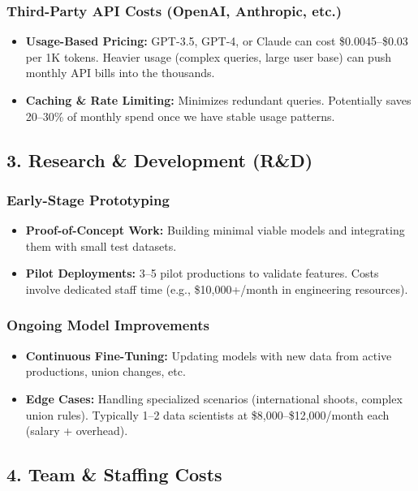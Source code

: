 \documentclass[11pt]{article}
\begin{document}
\subsubsection{Third-Party API Costs (OpenAI, Anthropic, etc.)}
\begin{itemize}
    \item \textbf{Usage-Based Pricing:} GPT-3.5, GPT-4, or Claude can cost \$0.0045--\$0.03 per 1K tokens. Heavier usage (complex queries, large user base) can push monthly API bills into the thousands.
    \item \textbf{Caching \& Rate Limiting:} Minimizes redundant queries. Potentially saves 20--30\% of monthly spend once we have stable usage patterns.
\end{itemize}

\subsection{3. Research \& Development (R\&D)}

\subsubsection{Early-Stage Prototyping}
\begin{itemize}
    \item \textbf{Proof-of-Concept Work:} Building minimal viable models and integrating them with small test datasets.
    \item \textbf{Pilot Deployments:} 3--5 pilot productions to validate features. Costs involve dedicated staff time (e.g., \$10,000+/month in engineering resources).
\end{itemize}

\subsubsection{Ongoing Model Improvements}
\begin{itemize}
    \item \textbf{Continuous Fine-Tuning:} Updating models with new data from active productions, union changes, etc.
    \item \textbf{Edge Cases:} Handling specialized scenarios (international shoots, complex union rules). Typically 1--2 data scientists at \$8,000--\$12,000/month each (salary + overhead).
\end{itemize}

\subsection{4. Team \& Staffing Costs}
\end{document}
